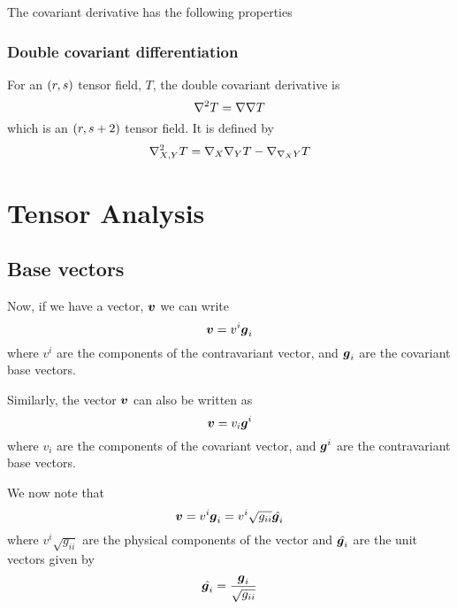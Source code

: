 The covariant derivative has the following properties

\subsubsection{Double covariant differentiation}

For an $\left( r,s \right)$ tensor field, $T$, the double covariant derivative is
\begin{equation}
  \doublecovarderivop{}{T}=\covarderivop{}{\covarderivop{}{T}}
\end{equation}
which is an $\left( r,s+2 \right)$ tensor field. It is defined by
\begin{equation}
  \doublecovarderivop{X,Y}{T}=\covarderivop{X}{\covarderivop{Y}{T}}-\covarderivop{\connection{X}{Y}}{T}
\end{equation}

\section{Tensor Analysis}
\subsection{Base vectors}

Now, if we have a vector, $ \boldsymbol{v} $ we can write
\begin{equation}
   \boldsymbol{v} =v^{i} \boldsymbol{g} _{i}
\end{equation}
where $v^{i}$ are the components of the contravariant vector, and
$ \boldsymbol{g} _{i}$ are the covariant base vectors.

Similarly, the vector $ \boldsymbol{v} $ can also be written as 
\begin{equation}
   \boldsymbol{v} =v_{i} \boldsymbol{g} ^{i}
\end{equation}
where $v_{i}$ are the components of the covariant vector, and
$ \boldsymbol{g} ^{i}$ are the contravariant base vectors. 

We now note that
\begin{equation}
   \boldsymbol{v} =v^{i} \boldsymbol{g} _{i}=v^{i}\sqrt{g_{ii}}\hat{ \boldsymbol{g} _{i}}
\end{equation}
where $v^{i}\sqrt{g_{ii}}$ are the physical components of the vector and
$\hat{ \boldsymbol{g} _{i}}$ are the unit vectors given by
\begin{equation}
  \hat{ \boldsymbol{g} _{i}}=\dfrac{ \boldsymbol{g} _{i}}{\sqrt{g_{ii}}}
\end{equation}

